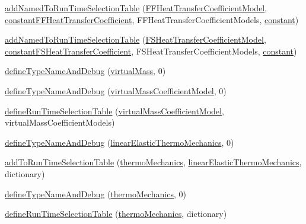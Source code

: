 \begin{DoxyCompactItemize}
\item 
\hyperlink{namespaceFoam_a3198b8f706d7cc200c601425a0f8c79a}{add\+Named\+To\+Run\+Time\+Selection\+Table} (\hyperlink{classFoam_1_1FFHeatTransferCoefficientModel}{F\+F\+Heat\+Transfer\+Coefficient\+Model}, \hyperlink{namespaceFoam_a52ece67744a1564202ddbe77f715659e}{constant\+F\+F\+Heat\+Transfer\+Coefficient}, F\+F\+Heat\+Transfer\+Coefficient\+Models, \hyperlink{classFoam_1_1constant}{constant})
\item 
\hyperlink{namespaceFoam_a84d7b7dae4ca14dd2ac0f6db58cf13a0}{add\+Named\+To\+Run\+Time\+Selection\+Table} (\hyperlink{classFoam_1_1FSHeatTransferCoefficientModel}{F\+S\+Heat\+Transfer\+Coefficient\+Model}, \hyperlink{namespaceFoam_a1a8374d33d29cd2e004e8a98ac1f3d32}{constant\+F\+S\+Heat\+Transfer\+Coefficient}, F\+S\+Heat\+Transfer\+Coefficient\+Models, \hyperlink{classFoam_1_1constant}{constant})
\item 
\hyperlink{namespaceFoam_a0afee0d6290a4d5400351deea11ea781}{define\+Type\+Name\+And\+Debug} (\hyperlink{classFoam_1_1virtualMass}{virtual\+Mass}, 0)
\item 
\hyperlink{namespaceFoam_a34564e19d9cafc7d63540aa6e27ef7de}{define\+Type\+Name\+And\+Debug} (\hyperlink{classFoam_1_1virtualMassCoefficientModel}{virtual\+Mass\+Coefficient\+Model}, 0)
\item 
\hyperlink{namespaceFoam_a3cdb8d0d494a0915205b054c1a3600cb}{define\+Run\+Time\+Selection\+Table} (\hyperlink{classFoam_1_1virtualMassCoefficientModel}{virtual\+Mass\+Coefficient\+Model}, virtual\+Mass\+Coefficient\+Models)
\item 
\hyperlink{namespaceFoam_a8ff85c85043da490b92706ed2cb803fe}{define\+Type\+Name\+And\+Debug} (\hyperlink{classFoam_1_1linearElasticThermoMechanics}{linear\+Elastic\+Thermo\+Mechanics}, 0)
\item 
\hyperlink{namespaceFoam_adb4fa5eccfbd1113ba7d015fe4364197}{add\+To\+Run\+Time\+Selection\+Table} (\hyperlink{classFoam_1_1thermoMechanics}{thermo\+Mechanics}, \hyperlink{classFoam_1_1linearElasticThermoMechanics}{linear\+Elastic\+Thermo\+Mechanics}, dictionary)
\item 
\hyperlink{namespaceFoam_a43325727e15421536896e299864adfe6}{define\+Type\+Name\+And\+Debug} (\hyperlink{classFoam_1_1thermoMechanics}{thermo\+Mechanics}, 0)
\item 
\hyperlink{namespaceFoam_a8341aa6d9ea0f20113261ed177a72c95}{define\+Run\+Time\+Selection\+Table} (\hyperlink{classFoam_1_1thermoMechanics}{thermo\+Mechanics}, dictionary)
\item 

\end{DoxyCompactItemize}
